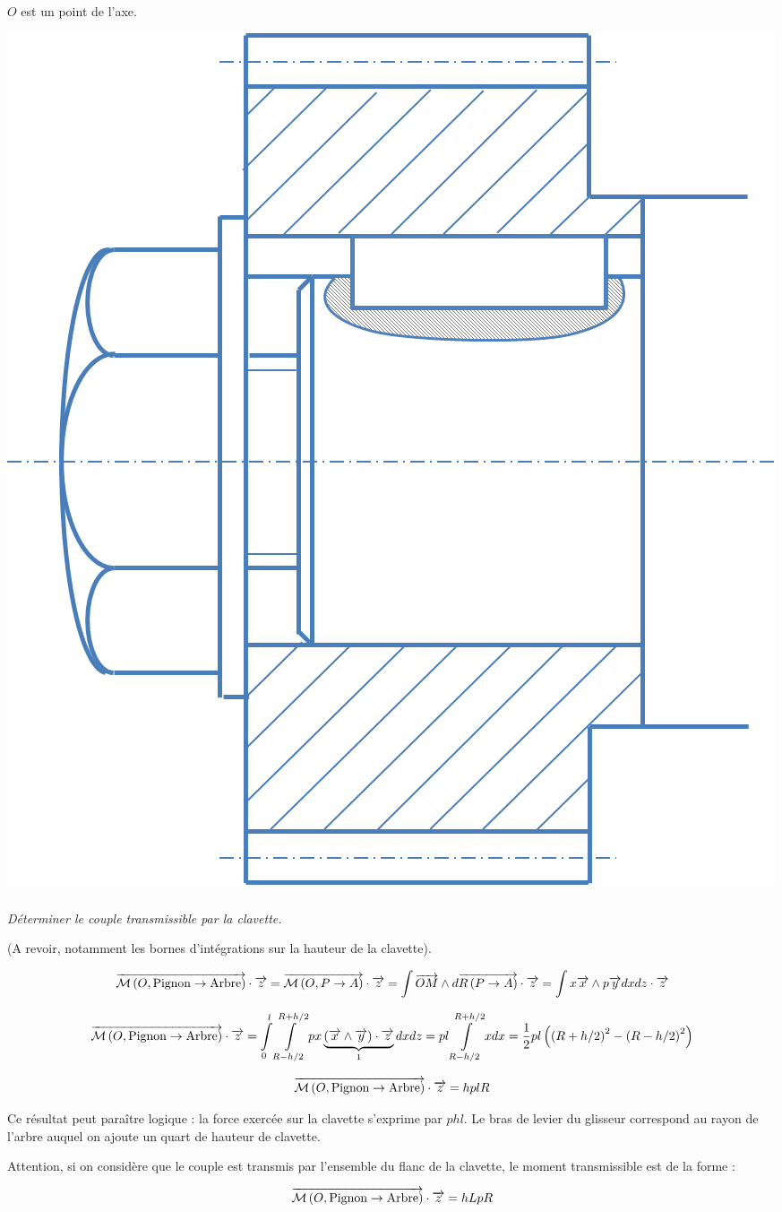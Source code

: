 \documentclass[10pt,fleqn]{article} %
\begin{document}
\begin{multicols}{2}
$O$ est un point de l'axe.
\begin{center}
\includegraphics[width=.7\linewidth]{png/clavette}
\end{center}

\subparagraph{}\textit{Déterminer le couple transmissible par la clavette.}

\ifprof
(A revoir, notamment les bornes d'intégrations sur la hauteur de la clavette).


$$
\overrightarrow{\mathcal{M}\left( {O}, {\text{Pignon}} \rightarrow {\text{Arbre}}\right)} \cdot \overrightarrow{z} = 
\overrightarrow{\mathcal{M}\left( {O}, {P} \rightarrow {A}\right)} \cdot \overrightarrow{z} 
= \int \overrightarrow{OM}\wedge d\overrightarrow{R\left( {P} \rightarrow {A}\right)} \cdot \overrightarrow{z}
= \int x\overrightarrow{x} \wedge p \overrightarrow{y}  dx dz \cdot \overrightarrow{z}
$$

$$
\overrightarrow{\mathcal{M}\left( {O}, {\text{Pignon}} \rightarrow {\text{Arbre}}\right)} \cdot \overrightarrow{z} 
= \int\limits_{0}^{l}\int\limits_{R-h/2}^{R+h/2} px\underbrace{\left( \overrightarrow{x} \wedge  \overrightarrow{y}\right)\cdot \overrightarrow{z}}_1  dx dz 
= pl\int\limits_{R-h/2}^{R+h/2} x  dx =\dfrac{1}{2}pl\left(\left(R+h/2 \right)^2-\left( R-h/2\right)^2 \right)
$$


$$
\overrightarrow{\mathcal{M}\left( {O}, {\text{Pignon}} \rightarrow {\text{Arbre}}\right)} \cdot \overrightarrow{z} 
=hplR
$$

Ce résultat peut paraître logique : la force exercée sur la clavette s'exprime par $phl$. Le bras de levier du glisseur correspond au rayon de l'arbre auquel on ajoute un quart de hauteur de clavette.


Attention, si on considère que le couple est transmis par l'ensemble du flanc de la clavette, le moment transmissible est de la forme : 

$$
\overrightarrow{\mathcal{M}\left( {O}, {\text{Pignon}} \rightarrow {\text{Arbre}}\right)} \cdot \overrightarrow{z} 
=hLpR
$$
\else
\fi

\ifprof
\else
\end{multicols}
\fi
\end{document}
